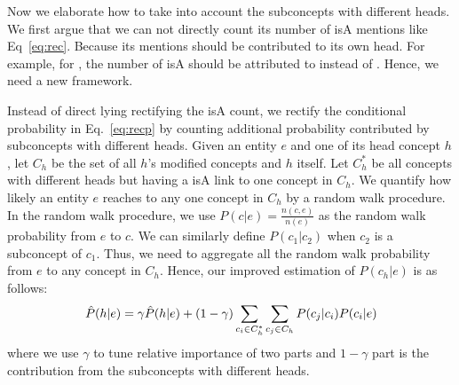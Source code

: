 %
Now we elaborate how to take into account the subconcepts with different heads. We first argue that we can not directly count its number of isA mentions like Eq~\ref{eq:rec}. Because its mentions should be contributed to its own head. For example, for , the number of  isA  should be attributed to  instead of .
Hence, we need a new framework.

Instead of direct lying rectifying the isA count, we rectify the conditional probability in Eq.~\ref{eq:recp} by counting additional probability contributed by subconcepts with different heads. Given an entity $e$ and one of its head concept $h$, let $C_h$ be the set of all $h$'s modified concepts and $h$ itself. Let $C^*_h$ be all concepts with different heads but having a isA link to one concept in $C_h$. We quantify how likely an entity $e$ reaches to any one concept in $C_h$ by a random walk procedure. In the random walk procedure, we use $P(c|e)=\frac{n(c,e)}{n(e)}$ as the random walk probability from $e$ to $c$. We can similarly define $P(c_1|c_2)$ when $c_2$ is a subconcept of $c_1$.  Thus, we need to aggregate all the random walk probability from $e$ to any concept in $C_h$.
Hence, our improved estimation of $P({c_h}|e)$ is as follows:
\begin{equation}
\small
\hat{P}({h}|e) = \gamma \hat{P}({h}|e)+ (1-\gamma) \sum_{c_i\in C^*_h}\sum_{ c_j\in C_h} P(c_j|c_i) P(c_i|e)
\label{eq:pgge}
\end{equation}
where we use $\gamma$ to tune relative importance of two parts and $1-\gamma$ part is the contribution from the subconcepts with different heads.


